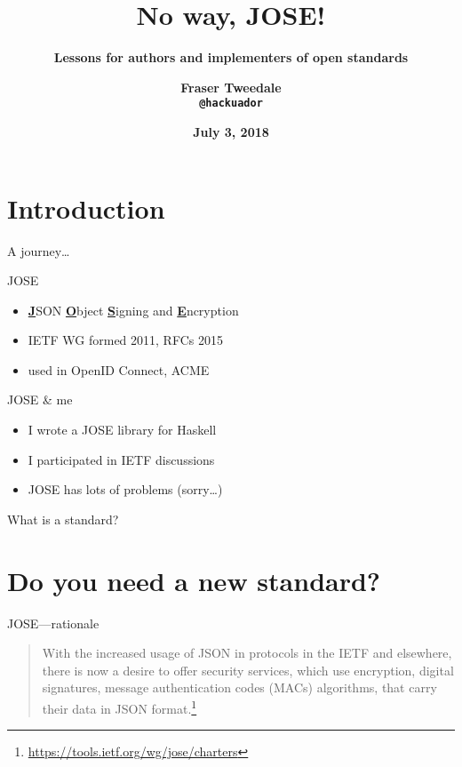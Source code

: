 \documentclass[ignorenonframetext,aspectratio=43]{beamer}
\title{\bf No way, JOSE!}
\subtitle{\bf Lessons for authors and implementers of open standards}
\author{\bf Fraser Tweedale\\
    \texttt{@hackuador}}
\date{\bf July 3, 2018}
\providecommand{\tightlist}{%
  \setlength{\itemsep}{0pt}\setlength{\parskip}{0pt}}
\begin{document}
\begin{frame}
\titlepage
\end{frame}

\section{Introduction}\label{introduction}

\begin{frame}
\huge
A journey\ldots
\end{frame}

\begin{frame}{JOSE}
\begin{itemize}
\tightlist
\item \underline{\bf J}SON \underline{\bf O}bject
      \underline{\bf S}igning and \underline{\bf E}ncryption
\item IETF WG formed 2011, RFCs 2015
\item used in OpenID Connect, ACME
\end{itemize}
\end{frame}

\begin{frame}{JOSE \& me}
\begin{itemize}
\tightlist
\item I wrote a JOSE library for Haskell
\item I participated in IETF discussions
\item JOSE has lots of problems (sorry\ldots)
\end{itemize}
\end{frame}

\begin{frame}
\huge What is a standard?
\end{frame}



\section{Do you need a new standard?}

\begin{frame}{JOSE---rationale}
\begin{quotation}
\Large
  With the increased usage of JSON in protocols in the IETF and
  elsewhere, there is now a desire to offer security services, which use
  encryption, digital signatures, message authentication codes (MACs)
  algorithms, that carry their data in JSON format.\footnote[frame]{
    \url{https://tools.ietf.org/wg/jose/charters}}
\end{quotation}

\end{frame}
\end{document}
